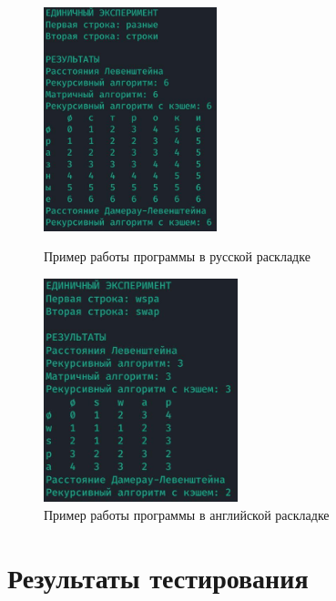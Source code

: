 \begin{figure}[ht!]
\begin{center}
    \begin{minipage}[h]{0.4\linewidth}
        \begin{center}
            \includegraphics[height=6.5cm]{../data/img/exRus.jpg}
            \caption{Пример работы программы в русской раскладке}
            \label{img:rus}
        \end{center}
    \end{minipage}
    \hspace{2ex}
    \begin{minipage}[h]{0.4\linewidth}
        \begin{center}
            \includegraphics[height=6.5cm]{../data/img/exEng.jpg}
            \caption{Пример работы программы в английской раскладке}
            \label{img:eng}
        \end{center}
    \end{minipage}
\end{center}
\end{figure}

\section{Результаты тестирования}

